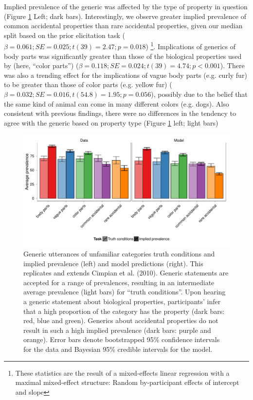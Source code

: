 \documentclass[10pt,letterpaper]{article}
\begin{document}
Implied prevalence of the generic was affected by the type of property in question (Figure \ref{fig:exp2b} Left; dark bars). 
Interestingly, we observe greater implied prevalence of common accidental properties than rare accidental properties, given our median split based on the prior elicitation task ($\beta=0.061; SE = 0.025; t(39) = 2.47; p = 0.018$) \footnote{These statistics are the result of a mixed-effects linear regression with a maximal mixed-effect structure: Random by-participant effects of intercept and slope}.
Implications of generics of body parts was significantly greater than those of the biological properties used by  (here, ``color parts'') ($\beta=0.118; SE = 0.024; t(39) = 4.74; p < 0.001$).
There was also a trending effect for the implications of vague body parts (e.g. curly fur) to be greater than those of color parts (e.g. yellow fur) ($\beta=0.032; SE = 0.016, t(54.8) = 1.95; p = 0.056$), possibly due to the belief that the same kind of animal can come in many different colors (e.g. dogs).
Also consistent with previous findings, there were no differences in the tendency to agree with the generic based on property type (Figure \ref{fig:exp2b} left; light bars)

\begin{figure}
\centering
    \includegraphics[width=\columnwidth]{asym-data-model-2phi-2so-50kx3.pdf}
    \caption{Generic utterances of unfamiliar categories truth conditions and implied prevalence (left) and model predictions (right). 
    This replicates and extends Cimpian et al. (2010). 
    Generic statements are accepted for a range of prevalences, resulting in an intermediate average prevalence (light bars) for ``truth conditions''. 
    Upon hearing a generic statement about biological properties, participants' infer that a high proportion of the category has the property (dark bars: red, blue and green). 
    Generics about accidental properties do not result in such a high implied prevalence (dark bars: purple and orange).  
    Error bars denote bootstrapped 95\% confidence intervals for the data and Bayesian 95\% credible intervals for the model.}
  \label{fig:exp2b}
\end{figure}
\end{document}
